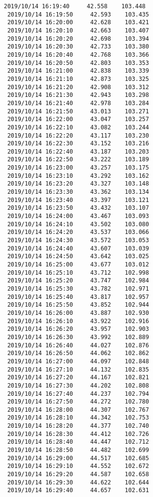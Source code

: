 \documentclass[11pt]{article}
\begin{document}
\begin{Verbatim}[commandchars=\\\{\}]
 2019/10/14 16:19:40     42.558    103.448
 2019/10/14 16:19:50     42.593    103.435
 2019/10/14 16:20:00     42.628    103.421
 2019/10/14 16:20:10     42.663    103.407
 2019/10/14 16:20:20     42.698    103.394
 2019/10/14 16:20:30     42.733    103.380
 2019/10/14 16:20:40     42.768    103.366
 2019/10/14 16:20:50     42.803    103.353
 2019/10/14 16:21:00     42.838    103.339
 2019/10/14 16:21:10     42.873    103.325
 2019/10/14 16:21:20     42.908    103.312
 2019/10/14 16:21:30     42.943    103.298
 2019/10/14 16:21:40     42.978    103.284
 2019/10/14 16:21:50     43.013    103.271
 2019/10/14 16:22:00     43.047    103.257
 2019/10/14 16:22:10     43.082    103.244
 2019/10/14 16:22:20     43.117    103.230
 2019/10/14 16:22:30     43.152    103.216
 2019/10/14 16:22:40     43.187    103.203
 2019/10/14 16:22:50     43.222    103.189
 2019/10/14 16:23:00     43.257    103.175
 2019/10/14 16:23:10     43.292    103.162
 2019/10/14 16:23:20     43.327    103.148
 2019/10/14 16:23:30     43.362    103.134
 2019/10/14 16:23:40     43.397    103.121
 2019/10/14 16:23:50     43.432    103.107
 2019/10/14 16:24:00     43.467    103.093
 2019/10/14 16:24:10     43.502    103.080
 2019/10/14 16:24:20     43.537    103.066
 2019/10/14 16:24:30     43.572    103.053
 2019/10/14 16:24:40     43.607    103.039
 2019/10/14 16:24:50     43.642    103.025
 2019/10/14 16:25:00     43.677    103.012
 2019/10/14 16:25:10     43.712    102.998
 2019/10/14 16:25:20     43.747    102.984
 2019/10/14 16:25:30     43.782    102.971
 2019/10/14 16:25:40     43.817    102.957
 2019/10/14 16:25:50     43.852    102.944
 2019/10/14 16:26:00     43.887    102.930
 2019/10/14 16:26:10     43.922    102.916
 2019/10/14 16:26:20     43.957    102.903
 2019/10/14 16:26:30     43.992    102.889
 2019/10/14 16:26:40     44.027    102.876
 2019/10/14 16:26:50     44.062    102.862
 2019/10/14 16:27:00     44.097    102.848
 2019/10/14 16:27:10     44.132    102.835
 2019/10/14 16:27:20     44.167    102.821
 2019/10/14 16:27:30     44.202    102.808
 2019/10/14 16:27:40     44.237    102.794
 2019/10/14 16:27:50     44.272    102.780
 2019/10/14 16:28:00     44.307    102.767
 2019/10/14 16:28:10     44.342    102.753
 2019/10/14 16:28:20     44.377    102.740
 2019/10/14 16:28:30     44.412    102.726
 2019/10/14 16:28:40     44.447    102.712
 2019/10/14 16:28:50     44.482    102.699
 2019/10/14 16:29:00     44.517    102.685
 2019/10/14 16:29:10     44.552    102.672
 2019/10/14 16:29:20     44.587    102.658
 2019/10/14 16:29:30     44.622    102.644
 2019/10/14 16:29:40     44.657    102.631

\end{Verbatim}
\end{document}
